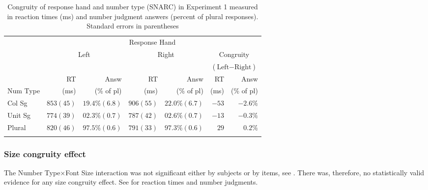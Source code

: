 \documentclass[output=paper]{langscibook}
\begin{document}
\begin{table}[h!]
\caption{Congruity of response hand and number type (SNARC) in Experiment 1 measured in reaction times (ms) and number judgment answers (percent of plural responses). Standard errors in parentheses}
\label{gul-bla:tab:SNARC-exp1}
\begin{tabularx}{.97\textwidth}{X r@{~~~}r r@{~~~}r r@{~~~}r}
\lsptoprule
&\multicolumn{6}{c}{Response Hand}\\\cmidrule(lr){2-7}
&\multicolumn{2}{c}{\multirow{2}{*}{Left}}&\multicolumn{2}{c}{\multirow{2}{*}{Right}}&\multicolumn{2}{c}{Congruity}\\
&&&&&\multicolumn{2}{c}{($\text{Left}-\text{Right}$)}\\\cmidrule(lr){2-3}\cmidrule(lr){4-5}\cmidrule(lr){6-7}
&RT&Answ&RT&Answ&RT&Answ\\
Num Type&(ms)&(\% of pl)&(ms)&(\% of pl)&(ms)&(\% of pl)\\\midrule
Col Sg  & $853 (45)$ & $19.4\% (6.8)$ & $906 (55)$ & $22.0\% (6.7)$ & $-53$ & $-2.6\%$ \\
Unit Sg & $774 (39)$ & $02.3\% (0.7)$ & $787 (42)$ & $02.6\% (0.7)$ & $-13$ & $-0.3\%$ \\
Plural  & $820 (46)$ & $97.5\% (0.6)$ & $791 (33)$ & $97.3\% (0.6)$ & $29$  & $0.2\%$  \\
\lspbottomrule
\end{tabularx}
\end{table}


\subsubsection{Size congruity effect}
The Number Type×Font Size interaction was not significant either by subjects or by items, see . There was, therefore, no statistically valid evidence for any size congruity effect. See  for reaction times and number judgments.

\end{document}
